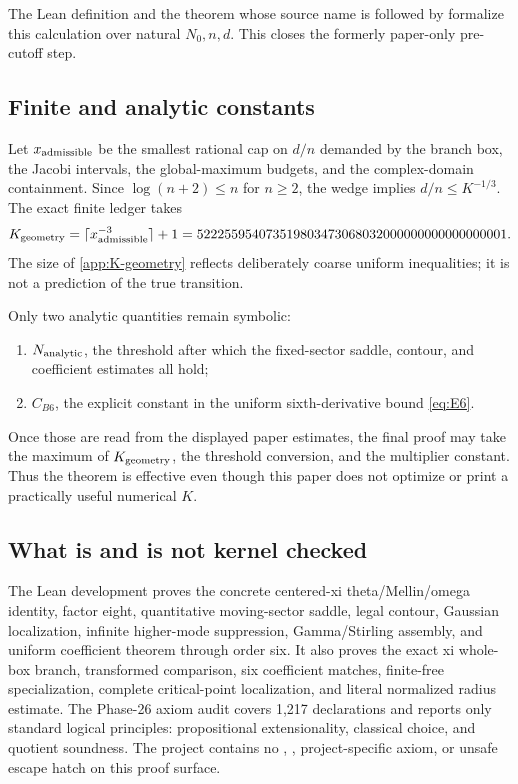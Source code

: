 The Lean definition  and the theorem
whose source name is  followed by
 formalize this calculation over natural
$N_0,n,d$.  This closes the formerly paper-only pre-cutoff step.

\subsection{Finite and analytic constants}

Let $x_{\rm admissible}$ be the smallest rational cap on $d/n$ demanded by
the branch box, the Jacobi intervals, the global-maximum budgets, and the
complex-domain containment.  Since $\log(n+2)\le n$ for $n\ge2$, the wedge
implies $d/n\le K^{-1/3}$.  The exact finite ledger takes
\begin{equation}\label{app:K-geometry}
 K_{\rm geometry}
 =\lceil x_{\rm admissible}^{-3}\rceil+1
 =522255954073519803473068032000000000000000001.
\end{equation}
The size of \eqref{app:K-geometry} reflects deliberately coarse uniform
inequalities; it is not a prediction of the true transition.

Only two analytic quantities remain symbolic:
\begin{enumerate}
\item $N_{\rm analytic}$, the threshold after which the fixed-sector saddle,
contour, and coefficient estimates all hold;
\item $C_{B6}$, the explicit constant in the uniform sixth-derivative bound
\eqref{eq:E6}.
\end{enumerate}
Once those are read from the displayed paper estimates, the final proof may
take the maximum of $K_{\rm geometry}$, the threshold conversion, and the
multiplier constant.  Thus the theorem is effective even though this paper
does not optimize or print a practically useful numerical $K$.

\subsection{What is and is not kernel checked}

The Lean development proves the concrete centered-xi theta/Mellin/omega
identity, factor eight, quantitative moving-sector saddle, legal contour,
Gaussian localization, infinite higher-mode suppression, Gamma/Stirling
assembly, and uniform coefficient theorem through order six.  It also proves
the exact xi whole-box branch, transformed comparison, six coefficient
matches, finite-free specialization, complete critical-point localization,
and literal normalized radius estimate.  The Phase-26 axiom audit covers
1,217 declarations and reports only standard logical principles:
propositional extensionality, classical choice, and quotient soundness.  The
project contains no , , project-specific axiom, or
unsafe escape hatch on this proof surface.

